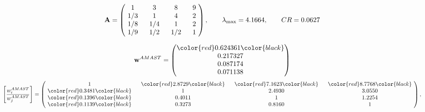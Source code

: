 \begin{example}
\begin{equation*}
\mathbf{A} =
\begin{pmatrix}
$\,\,$ 1 $\,\,$ & $\,\,$3$\,\,$ & $\,\,$8$\,\,$ & $\,\,$9 $\,\,$ \\
$\,\,$ 1/3$\,\,$ & $\,\,$ 1 $\,\,$ & $\,\,$4$\,\,$ & $\,\,$2 $\,\,$ \\
$\,\,$ 1/8$\,\,$ & $\,\,$ 1/4$\,\,$ & $\,\,$ 1 $\,\,$ & $\,\,$2 $\,\,$ \\
$\,\,$ 1/9$\,\,$ & $\,\,$ 1/2$\,\,$ & $\,\,$ 1/2$\,\,$ & $\,\,$ 1  $\,\,$ \\
\end{pmatrix},
\qquad
\lambda_{\max} =
4.1664,
\qquad
CR = 0.0627
\end{equation*}

\begin{equation*}
\mathbf{w}^{AMAST} =
\begin{pmatrix}
\color{red} 0.624361\color{black} \\
0.217327\\
0.087174\\
0.071138
\end{pmatrix}\end{equation*}
\begin{equation*}
\left[ \frac{{w}^{AMAST}_i}{{w}^{AMAST}_j} \right] =
\begin{pmatrix}
$\,\,$ 1 $\,\,$ & $\,\,$\color{red} 2.8729\color{black} $\,\,$ & $\,\,$\color{red} 7.1623\color{black} $\,\,$ & $\,\,$\color{red} 8.7768\color{black} $\,\,$ \\
$\,\,$\color{red} 0.3481\color{black} $\,\,$ & $\,\,$ 1 $\,\,$ & $\,\,$2.4930$\,\,$ & $\,\,$3.0550  $\,\,$ \\
$\,\,$\color{red} 0.1396\color{black} $\,\,$ & $\,\,$0.4011$\,\,$ & $\,\,$ 1 $\,\,$ & $\,\,$1.2254 $\,\,$ \\
$\,\,$\color{red} 0.1139\color{black} $\,\,$ & $\,\,$0.3273$\,\,$ & $\,\,$0.8160$\,\,$ & $\,\,$ 1  $\,\,$ \\
\end{pmatrix},
\end{equation*}


\end{example}
